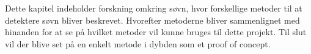 Dette kapitel indeholder forskning omkring søvn, hvor forskellige metoder til at detektere søvn bliver beskrevet.
Hvorefter metoderne bliver sammenlignet med hinanden for at se på hvilket metoder vil kunne bruges til dette projekt.
Til slut vil der blive set på en enkelt metode i dybden som et proof of concept.
